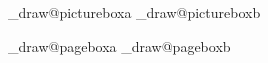 {{%

\newbox\brl@env_draw@pictureboxa%
\newbox\brl@env_draw@pictureboxb%

\newbox\brl@env_draw@pageboxa%
\newbox\brl@env_draw@pageboxb%


\def\brl@env_insert_pageref{%
  \brl@document_dospecial_pageref{fig:brl@figure\the\brl@figure@figurenum}%
  \edef\brl@tmp{{\brl@text_cmd_transopen ページ\brl@text_cmd_space\brl@tmp\brl@text_cmd_transclose}}%
  \expandafter\brl@text_direct\brl@tmp%
  \brl@print{0}{2}{\brl@text@toks}{\brl@bse@width}%
}


}}
